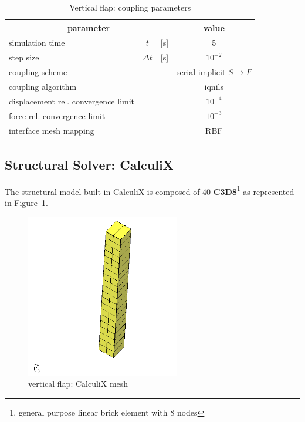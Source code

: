 \begin{table}[!htb]
	\begin{center}
		\begin{tabular}{ l c  l| c } 
			\multicolumn{3}{c|}{parameter} & value   \\ 
			\hline
			simulation time  & $t$& [\si{s}] & 5      \\
			step size & $\Delta t$ & [\si{s}] & $10^{-2}$   \\
			\hline
			coupling scheme & & & serial implicit  $S\rightarrow F$  \\
			coupling algorithm & & &  \acrshort{iqnils}  \\
			displacement rel. convergence limit & & & $10^{-4}$ \\
			force rel. convergence limit &&  & $10^{-3}$  \\
      		interface mesh mapping & & & RBF  \\
			
		\end{tabular}
	\end{center}
	\caption{Vertical flap: coupling parameters}
	\label{table:ex1-coupling}
\end{table}





\subsection{Structural Solver: CalculiX}

The structural model built in CalculiX is composed of 40 \textbf{C3D8}\footnote{general purpose linear brick element with 8 nodes} as represented in Figure~\ref{fig:cx-mesh}. 

\begin{figure}[htbp!]
	\centering
	\includegraphics[width=0.6\textwidth]{images/cx1}
	\caption{vertical flap: CalculiX mesh}
	\label{fig:cx-mesh}
\end{figure}

